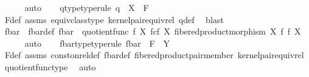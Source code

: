 \begin{isabellebody}
\ \ \ \ \isamarkupfalse%
\ auto\isanewline
\ \ \isamarkupfalse%
\ q{\isacharunderscore}{\kern0pt}type{\isacharbrackleft}{\kern0pt}type{\isacharunderscore}{\kern0pt}rule{\isacharbrackright}{\kern0pt}{\isacharcolon}{\kern0pt}\ {\isachardoublequoteopen}q\ {\isacharcolon}{\kern0pt}\ X\ {\isasymrightarrow}\ F{\isachardoublequoteclose}\isanewline
\ \ \ \ \isamarkupfalse%
\ F{\isacharunderscore}{\kern0pt}def\ assms{\isacharparenleft}{\kern0pt}{}{\isacharparenright}{\kern0pt}\ equiv{\isacharunderscore}{\kern0pt}class{\isacharunderscore}{\kern0pt}type\ kernel{\isacharunderscore}{\kern0pt}pair{\isacharunderscore}{\kern0pt}equiv{\isacharunderscore}{\kern0pt}rel\ q{\isacharunderscore}{\kern0pt}def\ \isamarkupfalse%
\ blast\isanewline
\ \ \ \ \isanewline
\ \ \isamarkupfalse%
\ f{\isacharunderscore}{\kern0pt}bar\ \ f{\isacharunderscore}{\kern0pt}bar{\isacharunderscore}{\kern0pt}def{\isacharcolon}{\kern0pt}\ {\isachardoublequoteopen}f{\isacharunderscore}{\kern0pt}bar\ {\isacharequal}{\kern0pt}\ quotient{\isacharunderscore}{\kern0pt}func\ f\ {\isacharparenleft}{\kern0pt}X\ \isactrlbsub f\isactrlesub {\isasymtimes}\isactrlsub c\isactrlbsub f\isactrlesub \ X{\isacharcomma}{\kern0pt}\ fibered{\isacharunderscore}{\kern0pt}product{\isacharunderscore}{\kern0pt}morphism\ X\ f\ f\ X{\isacharparenright}{\kern0pt}{\isachardoublequoteclose}\isanewline
\ \ \ \ \isamarkupfalse%
\ auto\isanewline
\ \ \isamarkupfalse%
\ f{\isacharunderscore}{\kern0pt}bar{\isacharunderscore}{\kern0pt}type{\isacharbrackleft}{\kern0pt}type{\isacharunderscore}{\kern0pt}rule{\isacharbrackright}{\kern0pt}{\isacharcolon}{\kern0pt}\ {\isachardoublequoteopen}f{\isacharunderscore}{\kern0pt}bar\ {\isacharcolon}{\kern0pt}\ F\ {\isasymrightarrow}\ Y{\isachardoublequoteclose}\ \isanewline
\ \ \ \ \ \ \isamarkupfalse%
\ F{\isacharunderscore}{\kern0pt}def\ assms{\isacharparenleft}{\kern0pt}{}{\isacharparenright}{\kern0pt}\ const{\isacharunderscore}{\kern0pt}on{\isacharunderscore}{\kern0pt}rel{\isacharunderscore}{\kern0pt}def\ f{\isacharunderscore}{\kern0pt}bar{\isacharunderscore}{\kern0pt}def\ fibered{\isacharunderscore}{\kern0pt}product{\isacharunderscore}{\kern0pt}pair{\isacharunderscore}{\kern0pt}member\ kernel{\isacharunderscore}{\kern0pt}pair{\isacharunderscore}{\kern0pt}equiv{\isacharunderscore}{\kern0pt}rel\ quotient{\isacharunderscore}{\kern0pt}func{\isacharunderscore}{\kern0pt}type\ \isamarkupfalse%
\ auto\isanewline
\ \ \isamarkupfalse%

\end{isabellebody}
